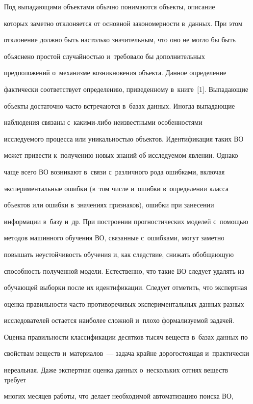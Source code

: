   Под выпадающими объектами  обычно понимаются объекты, описание 

которых заметно отклоняется от основной закономерности в~данных. При этом 

отклонение должно быть настолько значительным, что оно не могло бы быть 

объяснено простой случайностью и~требовало бы дополнительных 

предположений о~механизме возникновения объекта. Данное определение 

фактически соответствует определению, приведенному в~книге~[1]. Выпадающие 

объекты достаточно часто встречаются в~базах данных. Иногда выпадающие 

наблюдения связаны с~ка\-ки\-ми-ли\-бо неизвестными особенностями 

исследуемого процесса или уникальностью объектов. Идентификация таких ВО 

может привести к~получению новых знаний об исследуемом явлении. Однако 

чаще всего ВО возникают в~связи с~различного рода ошибками, включая 

экспериментальные ошибки (в~том числе и~ошибки в~определении класса 

объектов или ошибки в~значениях признаков), ошибки при занесении 

информации в~базу и~др. При построении прогностических моделей с~помощью 

методов машинного обучения ВО, связанные с~ошибками, могут заметно 

повышать неустойчивость обучения и, как следствие, снижать обобщающую 

способность полученной модели. Естественно, что такие ВО следует удалять из 

обучающей выборки после их идентификации. Следует отметить, что экспертная 

оценка правильности часто противоречивых экспериментальных данных разных 

исследователей остается наиболее сложной и~плохо формализуемой задачей. 

Оценка правильности классификации десятков тысяч веществ в~базах данных по 

свойствам веществ и~материалов~--- задача крайне дорогостоящая и~практически 

нереальная. Даже экспертная оценка данных о~нескольких сотнях веществ требует 

многих месяцев работы, что делает необходимой автоматизацию поиска ВО, 

